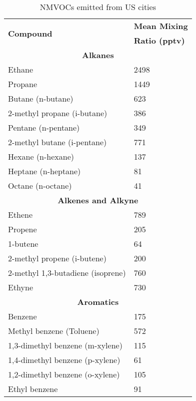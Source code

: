 \begin{table}
    \begin{center}
        \begin{tabular}{ll}
            \hline \hline
            \multirow{2}{*}{\textbf{Compound}} & \textbf{Mean Mixing} \\ & \textbf{Ratio (pptv)} \\
            \hline \hline \multicolumn{2}{c}{\textbf{Alkanes}}  \\ \hline
            Ethane & 2498 \\
            Propane  & 1449 \\
            Butane (n-butane) & 623 \\
            2-methyl propane (i-butane) & 386 \\
			Pentane (n-pentane) & 349 \\
            2-methyl butane (i-pentane) &771 \\
		    Hexane (n-hexane) & 137 \\
            Heptane (n-heptane) & 81 \\
            Octane (n-octane) & 41 \\ \hline \multicolumn{2}{c}{\textbf{Alkenes and Alkyne}} \\ \hline
            Ethene &789 \\
			Propene & 205 \\
            1-butene & 64 \\
            2-methyl propene (i-butene) & 200 \\
            2-methyl 1,3-butadiene (isoprene) & 760 \\
            Ethyne & 730 \\ \hline \multicolumn{2}{c}{\textbf{Aromatics}} \\ \hline 
			Benzene & 175 \\
            Methyl benzene (Toluene) & 572 \\
            1,3-dimethyl benzene (m-xylene) & 115 \\
            1,4-dimethyl benzene (p-xylene) & 61 \\
            1,2-dimethyl benzene (o-xylene) & 105 \\
			Ethyl benzene & 91 \\ \hline \hline
        \end{tabular}
    \end{center}
    \caption{NMVOCs emitted from US cities \citep{Baker:2008}} 
    \label{t:VOClist}
\end{table}

